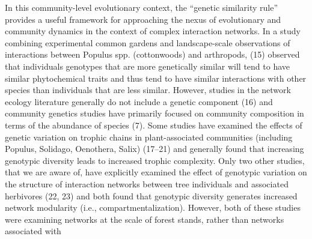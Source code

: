 \documentclass{article}
\begin{document}
In this community-level evolutionary context, the ``genetic similarity rule'' provides a useful framework for
approaching the nexus of evolutionary and community dynamics in the context of complex interaction networks. In a study
combining experimental common gardens and landscape-scale observations of interactions between Populus spp.
(cottonwoods) and arthropods, (15) observed that individuals genotypes that are more genetically similar will tend to
have similar phytochemical traits and thus tend to have similar interactions with other species than individuals that
are less similar. However, studies in the network ecology literature generally do not include a genetic component (16)
and community genetics studies have primarily focused on community composition in terms of the abundance of species
(7). Some studies have examined the effects of genetic variation on trophic chains in plant-associated communities
(including Populus, Solidago, Oenothera, Salix) (17--21) and generally found that increasing genotypic diversity leads
to increased trophic complexity. Only two other studies, that we are aware of, have explicitly examined the effect of
genotypic variation on the structure of interaction networks between tree individuals and associated herbivores (22,
23) and both found that genotypic diversity generates increased network modularity (i.e., compartmentalization).
However, both of these studies were examining networks at the scale of forest stands, rather than networks associated
with %
%
%
%
\end{document}
